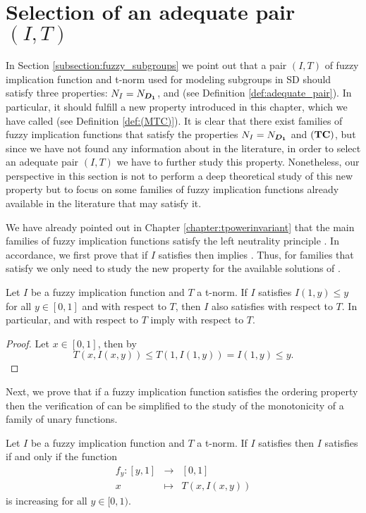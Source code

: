 \section{Selection of an adequate pair $(I,T)$}\label{section:pair(I,T)}

In Section \ref{subsection:fuzzy_subgroups} we point out that a pair $(I,T)$ of fuzzy implication function and t-norm used for modeling subgroups in SD should satisfy three properties: $N_I=N_{\bm{D_1}}$, \TC and \MTC (see Definition \ref{def:adequate_pair}). In particular, it should fulfill a new property introduced in this chapter, which we have called  \MTC (see Definition \ref{def:(MTC)}). It is clear that there exist families of fuzzy implication functions that satisfy the properties $N_I=N_{\bm{D_1}}$ and ${\bf(TC)}$, but since we have not found any information about \MTC in the literature, in order to select an adequate pair $(I,T)$ we have to further study this property. Nonetheless, our perspective in this section is not to perform a deep theoretical study of this new property but to focus on some families of fuzzy implication functions already available in the literature that may satisfy it.

We have already pointed out in Chapter \ref{chapter:tpowerinvariant} that the main families of fuzzy implication functions satisfy the left neutrality principle \NP. In accordance, we  first prove that if $I$ satisfies \NP then \MTC implies \TC. Thus, for families that satisfy \NP we only need to study the new property \MTC for the available solutions of \TC.

\begin{proposition}
	Let $I$ be a fuzzy implication function and $T$ a t-norm. If $I$ satisfies $I(1,y) \leq y$ for all $y \in [0,1]$ and \MTC with respect to $T$, then $I$ also satisfies \TC with respect to $T$. In particular, \NP and \MTC with respect to $T$ imply \TC with respect to $T$.
\end{proposition}

\begin{proof}
	Let $x \in [0,1]$, then by \MTC
	$$T(x,I(x,y)) \leq T(1,I(1,y))=I(1,y)\leq y.$$
\end{proof}

Next, we prove that if a fuzzy implication function satisfies the ordering property then the verification of \MTC can be simplified to the study of the monotonicity of a family of unary functions.

\begin{proposition}\label{prop:(MTC)&(OP)}
	Let $I$ be a fuzzy implication function and $T$ a t-norm. If $I$ satisfies \OP then $I$ satisfies \MTC if and only if the function	
	$$   
	\begin{array}{rcl}
		f_{y}:[y,1]&\longrightarrow&[0,1]\\
		x&\longmapsto& T(x,I(x,y))
	\end{array}
	$$
	is increasing for all $y \in [0,1)$.
\end{proposition}

